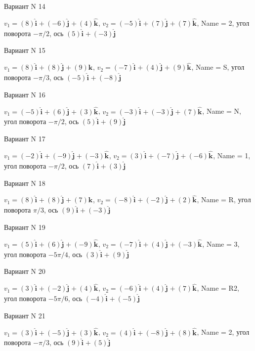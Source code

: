 \documentclass[11pt]{report}
\begin{document}
Вариант N 14

$v_1 = (8)\mathbf{\hat{i}_{}} + (-6)\mathbf{\hat{j}_{}} + (4)\mathbf{\hat{k}_{}}$, $v_2 = (-5)\mathbf{\hat{i}_{}} + (7)\mathbf{\hat{j}_{}} + (7)\mathbf{\hat{k}_{}}$, Name = 2, угол поворота $- \pi / 2$, ось $(5)\mathbf{\hat{i}_{}} + (-3)\mathbf{\hat{j}_{}}$

Вариант N 15

$v_1 = (8)\mathbf{\hat{i}_{}} + (8)\mathbf{\hat{j}_{}} + (9)\mathbf{\hat{k}_{}}$, $v_2 = (-7)\mathbf{\hat{i}_{}} + (4)\mathbf{\hat{j}_{}} + (9)\mathbf{\hat{k}_{}}$, Name = S, угол поворота $- \pi / 3$, ось $(-5)\mathbf{\hat{i}_{}} + (-8)\mathbf{\hat{j}_{}}$

Вариант N 16

$v_1 = (-5)\mathbf{\hat{i}_{}} + (6)\mathbf{\hat{j}_{}} + (3)\mathbf{\hat{k}_{}}$, $v_2 = (-3)\mathbf{\hat{i}_{}} + (-3)\mathbf{\hat{j}_{}} + (7)\mathbf{\hat{k}_{}}$, Name = N, угол поворота $- \pi / 2$, ось $(5)\mathbf{\hat{i}_{}} + (9)\mathbf{\hat{j}_{}}$

Вариант N 17

$v_1 = (-2)\mathbf{\hat{i}_{}} + (-9)\mathbf{\hat{j}_{}} + (-3)\mathbf{\hat{k}_{}}$, $v_2 = (3)\mathbf{\hat{i}_{}} + (-7)\mathbf{\hat{j}_{}} + (-6)\mathbf{\hat{k}_{}}$, Name = 1, угол поворота $- \pi / 2$, ось $(7)\mathbf{\hat{i}_{}} + (3)\mathbf{\hat{j}_{}}$

Вариант N 18

$v_1 = (8)\mathbf{\hat{i}_{}} + (8)\mathbf{\hat{j}_{}} + (7)\mathbf{\hat{k}_{}}$, $v_2 = (-8)\mathbf{\hat{i}_{}} + (-2)\mathbf{\hat{j}_{}} + (2)\mathbf{\hat{k}_{}}$, Name = R, угол поворота $\pi / 3$, ось $(9)\mathbf{\hat{i}_{}} + (-3)\mathbf{\hat{j}_{}}$

Вариант N 19

$v_1 = (5)\mathbf{\hat{i}_{}} + (6)\mathbf{\hat{j}_{}} + (-9)\mathbf{\hat{k}_{}}$, $v_2 = (-7)\mathbf{\hat{i}_{}} + (4)\mathbf{\hat{j}_{}} + (-3)\mathbf{\hat{k}_{}}$, Name = 3, угол поворота $- 5 \pi / 4$, ось $(3)\mathbf{\hat{i}_{}} + (9)\mathbf{\hat{j}_{}}$

Вариант N 20

$v_1 = (3)\mathbf{\hat{i}_{}} + (-2)\mathbf{\hat{j}_{}} + (4)\mathbf{\hat{k}_{}}$, $v_2 = (-6)\mathbf{\hat{i}_{}} + (4)\mathbf{\hat{j}_{}} + (7)\mathbf{\hat{k}_{}}$, Name = R2, угол поворота $- 5 \pi / 6$, ось $(-4)\mathbf{\hat{i}_{}} + (-5)\mathbf{\hat{j}_{}}$

Вариант N 21

$v_1 = (3)\mathbf{\hat{i}_{}} + (-5)\mathbf{\hat{j}_{}} + (3)\mathbf{\hat{k}_{}}$, $v_2 = (4)\mathbf{\hat{i}_{}} + (-8)\mathbf{\hat{j}_{}} + (8)\mathbf{\hat{k}_{}}$, Name = 2, угол поворота $- \pi / 3$, ось $(9)\mathbf{\hat{i}_{}} + (5)\mathbf{\hat{j}_{}}$
\end{document}
